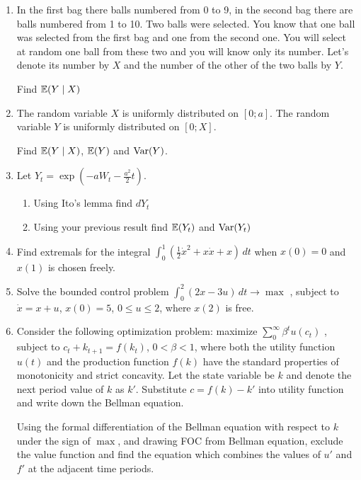 \documentclass[12pt, a4paper]{article}
\begin{document}
\begin{enumerate}
\item In the first bag there balls numbered from 0 to 9, in the second bag there are balls numbered from 1 to 10. Two balls were selected. You know that one ball was selected from the first bag and one from the second one. You will select at random one ball from these two and you will know only its number. Let’s denote its number by $X$ and the number of the other of the two balls by $Y$.

Find $\mathbb{E}(Y\mid X)$

\item The random variable $X$ is uniformly distributed on $[0;a]$. The random variable $Y$ is uniformly distributed on $[0;X]$.

Find $\mathbb{E}(Y\mid X)$, $\mathbb{E}(Y)$  and $\operatorname{Var}(Y)$.
\item Let
$Y_t=\exp\left(-aW_t-\frac{a^2}{2}t\right)$.
\begin{enumerate}
\item Using Ito’s lemma find $dY_t$
\item Using your previous result find $\mathbb{E}(Y_t)$ and $\operatorname{Var}(Y_t)$
\end{enumerate}

\item Find extremals for the integral
$\int_0^1 \left(\frac{1}{2}\dot{x}^2+x\dot{x}+x\right)\, dt$
when $x(0)=0$ and $x(1)$ is chosen freely.

\item Solve the bounded control problem
$\int_0^2 (2x-3u)\,dt \to \max$
, subject to $\dot{x}=x+u$, $x(0)=5$, $0\leq u \leq 2$, where $x(2)$ is free.

\item Consider the following optimization problem: maximize
$\sum_0^{\infty}\beta^t u(c_t)$
, subject to $c_t+k_{t+1}=f(k_t)$, $0<\beta<1$, where both the utility function $u(t)$  and the production function $f(k)$ have the standard properties of monotonicity and strict concavity. Let the state variable be $k$ and denote the next period value of $k$ as $k'$. Substitute $c=f(k)-k'$ into utility function and write down the Bellman equation.


Using the formal differentiation of the Bellman equation with respect to $k$ under the sign of $\max$, and drawing  FOC from Bellman equation, exclude the value function and find the equation which combines the values of $u'$ and $f'$  at the adjacent time periods.

\end{enumerate}
\end{document}
